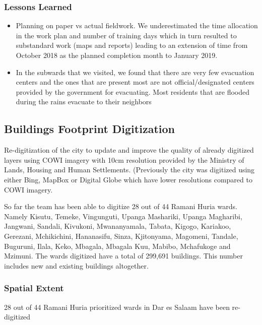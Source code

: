 \documentclass[a4paper,12pt,twoside]{article}
\begin{document}
\subsubsection{Lessons Learned}
\begin{itemize}
	\item Planning on paper vs actual fieldwork. We underestimated the time allocation in the work plan and number of training days which in turn resulted to substandard work (maps and reports) leading to an extension of time from October 2018 as the planned completion month to January 2019.
	\item In the subwards that we visited, we found that there are very few evacuation centers and the ones that are present most are not official/designated centers provided by the government for evacuating. Most residents that are flooded during the rains evacuate to their neighbors 
\end{itemize}

\newpage
\subsection{Buildings Footprint Digitization}
\begin{multicols}{2}
Re-digitization of the city to update and improve the quality of already digitized layers using COWI imagery with 10cm resolution provided by the Ministry of Lands, Housing and Human Settlements. (Previously the city was digitized using either Bing, MapBox or Digital Globe which have lower resolutions compared to COWI imagery. 

So far the team has been able to digitize 28 out of 44 Ramani Huria wards. Namely Kisutu, Temeke, Vingunguti, Upanga Mashariki, Upanga Magharibi, Jangwani, Sandali, Kivukoni, Mwananyamala, Tabata, Kigogo, Kariakoo, Gerezani, Mchikichini, Hananasifu, Sinza, Kjitonyama, Magomeni, Tandale, Buguruni, Ilala, Keko, Mbagala, Mbagala Kuu, Mabibo, Mchafukoge and Mzimuni. The wards digitized have a total of 299,691 buildings. This number includes new and existing buildings altogether.
\end{multicols}

\subsubsection{Spatial Extent}
28 out of 44 Ramani Huria prioritized wards in Dar es Salaam have been re-digitized
\end{document}

